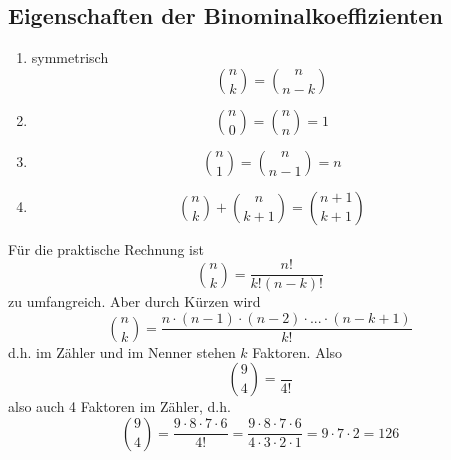 \documentclass{report}
\begin{document}
\subsection{Eigenschaften der Binominalkoeffizienten}
\begin{enumerate}
\item
symmetrisch
\begin{equation}
\binom{n}{k} = \binom{n}{n-k}
\end{equation}
\item
\begin{equation}
\binom{n}{0} = \binom{n}{n} = 1
\end{equation}
\item
\begin{equation}
\binom{n}{1} = \binom{n}{n-1} = n
\end{equation}
\item
\begin{equation}
\binom{n}{k} + \binom{n}{k+1} = \binom{n+1}{k+1}
\end{equation}
\end{enumerate}
Für die praktische Rechnung ist
\begin{equation}
\binom{n}{k} = \frac{n!}{k! (n-k)!}
\end{equation}
zu umfangreich. Aber durch Kürzen wird
\begin{equation}
\binom{n}{k} = \frac{n \cdot (n-1) \cdot (n-2) \cdot ... \cdot (n-k+1)}{k!}
\end{equation}
d.h. im Zähler und im Nenner stehen $k$ Faktoren. Also
\begin{equation}
\binom{9}{4} = \frac{}{4!}
\end{equation}
also auch 4 Faktoren im Zähler, d.h.
\begin{equation}
\binom{9}{4} = \frac{9 \cdot 8 \cdot 7 \cdot 6}{4!} = \frac{9 \cdot 8 \cdot 7 \cdot 6}{4 \cdot 3 \cdot 2 \cdot 1} = 9 \cdot 7 \cdot 2 = 126
\end{equation}
\end{document}
